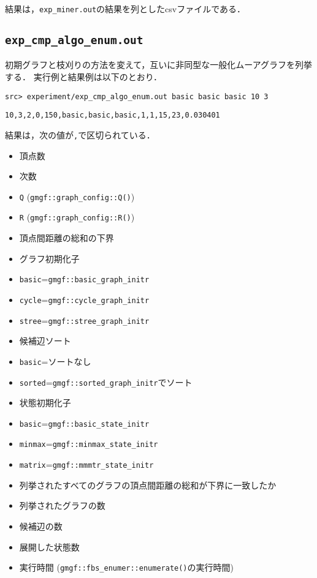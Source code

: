 結果は，\texttt{exp\_miner.out}の結果を列としたcsvファイルである．

\subsection*{\texorpdfstring{\texttt{exp\_cmp\_algo\_enum.out}}{exp\_cmp\_algo\_enum.out}}\label{expux5fcmpux5falgoux5fenum.out}

初期グラフと枝刈りの方法を変えて，互いに非同型な一般化ムーアグラフを列挙する．
実行例と結果例は以下のとおり．

\begin{verbatim}
src> experiment/exp_cmp_algo_enum.out basic basic basic 10 3
\end{verbatim}

\begin{verbatim}
10,3,2,0,150,basic,basic,basic,1,1,15,23,0.030401
\end{verbatim}

結果は，次の値が\texttt{,}で区切られている．

\begin{itemize}
\tightlist
\item
  頂点数
\item
  次数
\item
  \texttt{Q} (\texttt{gmgf::graph\_config::Q()})
\item
  \texttt{R} (\texttt{gmgf::graph\_config::R()})
\item
  頂点間距離の総和の下界
\item
  グラフ初期化子
\item
  \texttt{basic}=\texttt{gmgf::basic\_graph\_initr}
\item
  \texttt{cycle}=\texttt{gmgf::cycle\_graph\_initr}
\item
  \texttt{stree}=\texttt{gmgf::stree\_graph\_initr}
\item
  候補辺ソート
\item
  \texttt{basic}=ソートなし
\item
  \texttt{sorted}=\texttt{gmgf::sorted\_graph\_initr}でソート
\item
  状態初期化子
\item
  \texttt{basic}=\texttt{gmgf::basic\_state\_initr}
\item
  \texttt{minmax}=\texttt{gmgf::minmax\_state\_initr}
\item
  \texttt{matrix}=\texttt{gmgf::mmmtr\_state\_initr}
\item
  列挙されたすべてのグラフの頂点間距離の総和が下界に一致したか
\item
  列挙されたグラフの数
\item
  候補辺の数
\item
  展開した状態数
\item
  実行時間 (\texttt{gmgf::fbs\_enumer::enumerate()}の実行時間)
\end{itemize}

